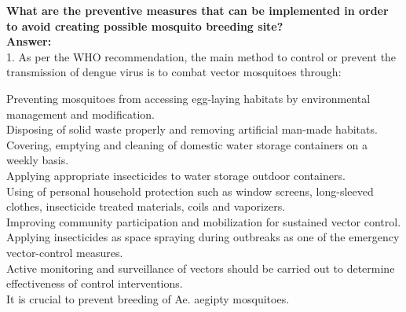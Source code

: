 \documentclass[11pt]{exam}
\begin{document}
\begin{questions}

%
%
%
%
%


\question
\label{10. Dengue: Prevention and Control }
\textbf{What are the preventive measures that can be implemented in order to avoid creating possible mosquito breeding site?} \\
\textbf{Answer:} \\
1. As per the WHO recommendation, the main method to control or prevent the transmission of dengue virus is to combat vector mosquitoes through:

Preventing mosquitoes from accessing egg-laying habitats by environmental management and modification. \\
Disposing of solid waste properly and removing artificial man-made habitats.\\
Covering, emptying and cleaning of domestic water storage containers on a weekly basis.\\
Applying appropriate insecticides to water storage outdoor containers.\\
Using of personal household protection such as window screens, long-sleeved clothes, insecticide treated materials, coils and vaporizers.\\
Improving community participation and mobilization for sustained vector control.\\
Applying insecticides as space spraying during outbreaks as one of the emergency vector-control measures.\\
Active monitoring and surveillance of vectors should be carried out to determine effectiveness of control interventions.\\
It is crucial to prevent breeding of Ae. aegipty mosquitoes.










\end{questions}
\end{document}
